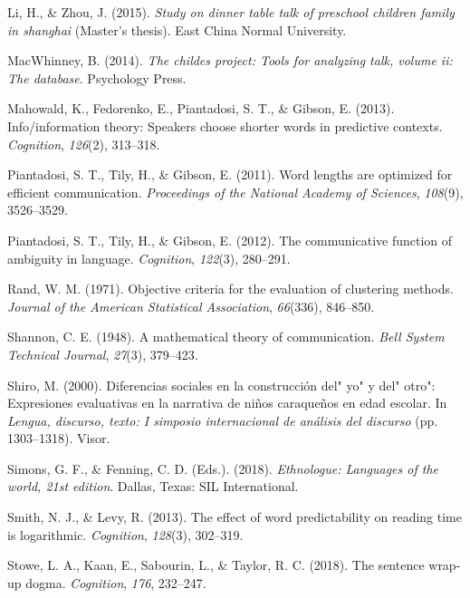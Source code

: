 \documentclass[10pt, letterpaper]{article}
\begin{document}
\leavevmode\hypertarget{ref-li2015}{}%
Li, H., \& Zhou, J. (2015). \emph{Study on dinner table talk of
preschool children family in shanghai} (Master's thesis). East China
Normal University.

\leavevmode\hypertarget{ref-macwhinney2014}{}%
MacWhinney, B. (2014). \emph{The childes project: Tools for analyzing
talk, volume ii: The database}. Psychology Press.

\leavevmode\hypertarget{ref-mahowald2013}{}%
Mahowald, K., Fedorenko, E., Piantadosi, S. T., \& Gibson, E. (2013).
Info/information theory: Speakers choose shorter words in predictive
contexts. \emph{Cognition}, \emph{126}(2), 313--318.

\leavevmode\hypertarget{ref-piantadosi2011}{}%
Piantadosi, S. T., Tily, H., \& Gibson, E. (2011). Word lengths are
optimized for efficient communication. \emph{Proceedings of the National
Academy of Sciences}, \emph{108}(9), 3526--3529.

\leavevmode\hypertarget{ref-piantadosi2012}{}%
Piantadosi, S. T., Tily, H., \& Gibson, E. (2012). The communicative
function of ambiguity in language. \emph{Cognition}, \emph{122}(3),
280--291.

\leavevmode\hypertarget{ref-rand1971}{}%
Rand, W. M. (1971). Objective criteria for the evaluation of clustering
methods. \emph{Journal of the American Statistical Association},
\emph{66}(336), 846--850.

\leavevmode\hypertarget{ref-shannon1948}{}%
Shannon, C. E. (1948). A mathematical theory of communication.
\emph{Bell System Technical Journal}, \emph{27}(3), 379--423.

\leavevmode\hypertarget{ref-shiro2000}{}%
Shiro, M. (2000). Diferencias sociales en la construcción del" yo" y
del" otro": Expresiones evaluativas en la narrativa de niños caraqueños
en edad escolar. In \emph{Lengua, discurso, texto: I simposio
internacional de análisis del discurso} (pp. 1303--1318). Visor.

\leavevmode\hypertarget{ref-simons2018}{}%
Simons, G. F., \& Fenning, C. D. (Eds.). (2018). \emph{Ethnologue:
Languages of the world, 21st edition}. Dallas, Texas: SIL International.

\leavevmode\hypertarget{ref-smith2013}{}%
Smith, N. J., \& Levy, R. (2013). The effect of word predictability on
reading time is logarithmic. \emph{Cognition}, \emph{128}(3), 302--319.

\leavevmode\hypertarget{ref-stowe2018}{}%
Stowe, L. A., Kaan, E., Sabourin, L., \& Taylor, R. C. (2018). The
sentence wrap-up dogma. \emph{Cognition}, \emph{176}, 232--247.
\end{document}
